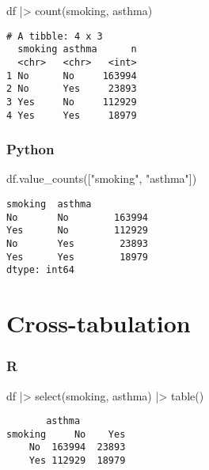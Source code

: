 \documentclass[
  letterpaper,
  DIV=11,
  numbers=noendperiod]{scrreprt}
\newenvironment{Shaded}{\begin{snugshade}}{\end{snugshade}}
\newcommand{\FunctionTok}[1]{\textcolor[rgb]{0.28,0.35,0.67}{#1}}
\newcommand{\NormalTok}[1]{\textcolor[rgb]{0.00,0.46,0.62}{#1}}
\newcommand{\SpecialCharTok}[1]{\textcolor[rgb]{0.37,0.37,0.37}{#1}}
\newcommand{\StringTok}[1]{\textcolor[rgb]{0.13,0.47,0.30}{#1}}
\begin{document}
\begin{Shaded}
\begin{Highlighting}[]
\NormalTok{df }\SpecialCharTok{|\textgreater{}} \FunctionTok{count}\NormalTok{(smoking, asthma)}
\end{Highlighting}
\end{Shaded}

\begin{verbatim}
# A tibble: 4 x 3
  smoking asthma      n
  <chr>   <chr>   <int>
1 No      No     163994
2 No      Yes     23893
3 Yes     No     112929
4 Yes     Yes     18979
\end{verbatim}

\hypertarget{python-26}{%
\subsubsection{Python}\label{python-26}}

\begin{Shaded}
\begin{Highlighting}[]
\NormalTok{df.value\_counts([}\StringTok{"smoking"}\NormalTok{, }\StringTok{"asthma"}\NormalTok{])}
\end{Highlighting}
\end{Shaded}

\begin{verbatim}
smoking  asthma
No       No        163994
Yes      No        112929
No       Yes        23893
Yes      Yes        18979
dtype: int64
\end{verbatim}

\hypertarget{cross-tabulation}{%
\section{Cross-tabulation}\label{cross-tabulation}}

\hypertarget{r-27}{%
\subsubsection{R}\label{r-27}}

\begin{Shaded}
\begin{Highlighting}[]
\NormalTok{df }\SpecialCharTok{|\textgreater{}} \FunctionTok{select}\NormalTok{(smoking, asthma) }\SpecialCharTok{|\textgreater{}} \FunctionTok{table}\NormalTok{()}
\end{Highlighting}
\end{Shaded}

\begin{verbatim}
       asthma
smoking     No    Yes
    No  163994  23893
    Yes 112929  18979
\end{verbatim}
\end{document}
